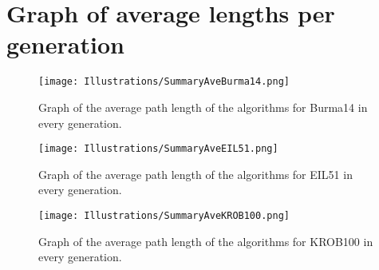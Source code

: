\chapter{Graph of average lengths per generation}
\label{chap:appendix4}

\begin{figure}[H]
	\caption{Graph of the average path length of the algorithms for Burma14 in every generation.}
	\texttt{[image: Illustrations/SummaryAveBurma14.png]}
	\centering
	\label{fig:Burma14Average}
\end{figure}

\begin{figure}[H]
	\caption{Graph of the average path length of the algorithms for EIL51 in every generation.}
	\texttt{[image: Illustrations/SummaryAveEIL51.png]}
	\centering
	\label{fig:EIL51Average}
\end{figure}

\begin{figure}[H]
	\caption{Graph of the average path length of the algorithms for KROB100 in every generation.}
	\texttt{[image: Illustrations/SummaryAveKROB100.png]}
	\centering
	\label{fig:KROB100Average}
\end{figure}